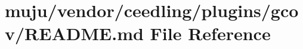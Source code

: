 \hypertarget{vendor_2ceedling_2plugins_2gcov_2_r_e_a_d_m_e_8md}{}\section{muju/vendor/ceedling/plugins/gcov/\+R\+E\+A\+D\+ME.md File Reference}
\label{vendor_2ceedling_2plugins_2gcov_2_r_e_a_d_m_e_8md}
